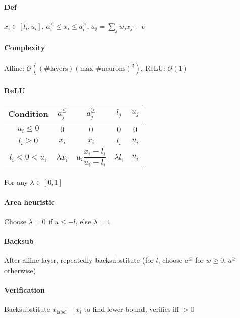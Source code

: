 \paragraph{Def} $x_i \in [l_i, u_i]$, $a_i^\le \le x_i \le a_i^\ge$, $a_i^\cdot = \sum_j w_j x_j + v$
\paragraph{Complexity} Affine: $\mathcal{O}(\left(\text{\#layers} \right) \left(\text{max \#neurons}\right)^2)$, ReLU: $\mathcal{O}(1)$
\paragraph{ReLU}
\begin{tabular}[t]{c|c|c|c|c}
    Condition & $a_j^\le$ & $a_j^\ge$ & $l_j$ & $u_j$ \\\midrule
    $u_i \le 0$ & 0 & 0 & 0 & 0 \\
    $l_i \ge 0$ & $x_i$ & $x_i$ & $l_i$ & $u_i$ \\
    $l_i < 0 < u_i$ & $\lambda x_i$ & $u_i \dfrac{x_i-l_i}{u_i-l_i}$ & $\lambda l_i$ & $u_i$ 
\end{tabular}
For any $\lambda \in [0,1]$
\paragraph{Area heuristic} Choose $\lambda=0$ if $u\le-l$, else $\lambda=1$

\paragraph{Backsub} After affine layer, repeatedly backsubstitute (for $l$, choose $a^\le$ for $w \ge 0$, $a^\ge$ otherwise)
\paragraph{Verification} Backsubstitute $x_\text{label} - x_i$ to find lower bound, verifies iff $> 0$